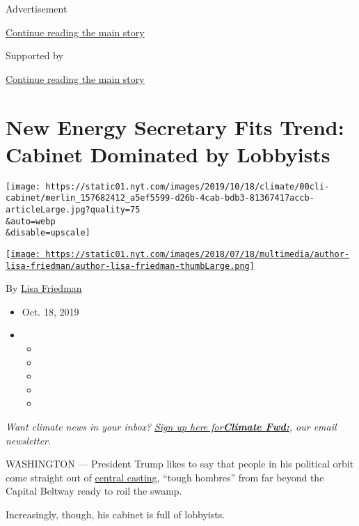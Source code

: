 Advertisement

\protect\hyperlink{after-top}{Continue reading the main story}

Supported by

\protect\hyperlink{after-sponsor}{Continue reading the main story}

\hypertarget{new-energy-secretary-fits-trend-cabinet-dominated-by-lobbyists}{%
\section{New Energy Secretary Fits Trend: Cabinet Dominated by
Lobbyists}\label{new-energy-secretary-fits-trend-cabinet-dominated-by-lobbyists}}

\texttt{[image: https://static01.nyt.com/images/2019/10/18/climate/00cli-cabinet/merlin\_157682412\_a5ef5599-d26b-4cab-bdb3-81367417accb-articleLarge.jpg?quality=75\\\&auto=webp\\\&disable=upscale]}

\href{https://www.nytimes.com/by/lisa-friedman}{\texttt{[image: https://static01.nyt.com/images/2018/07/18/multimedia/author-lisa-friedman/author-lisa-friedman-thumbLarge.png]}}

By \href{https://www.nytimes.com/by/lisa-friedman}{Lisa Friedman}

\begin{itemize}
\item
  Oct. 18, 2019
\item
  \begin{itemize}
  \item
  \item
  \item
  \item
  \item
  \end{itemize}
\end{itemize}

\emph{Want climate news in your inbox?}
\href{https://www.nytimes.com/newsletters/climate-change}{\emph{Sign up
here
for}}\textbf{\href{https://www.nytimes.com/newsletters/climate-change}{\emph{Climate
Fwd:}}}\emph{, our email newsletter.}

WASHINGTON --- President Trump likes to say that people in his political
orbit come straight out of
\href{https://www.nytimes.com/2017/01/20/us/politics/president-trump-day.html}{central
casting}, ``tough hombres'' from far beyond the Capital Beltway ready to
roil the swamp.

Increasingly, though, his cabinet is full of lobbyists.

